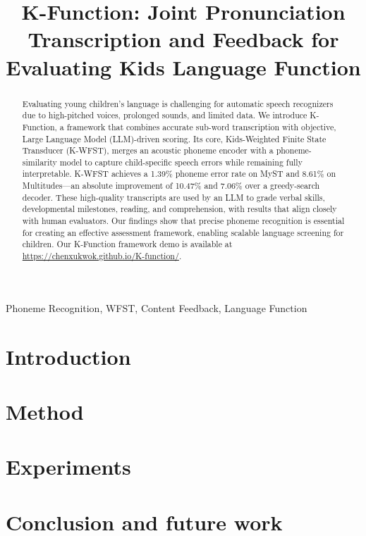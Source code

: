 \documentclass{article}
\title{K-Function: Joint Pronunciation Transcription and Feedback for Evaluating Kids Language Function}
\begin{document}
\ninept
%
\maketitle
%
\begin{abstract}
Evaluating young children's language is challenging for automatic speech recognizers due to high-pitched voices, prolonged sounds, and limited data. We introduce K-Function, a framework that combines accurate sub-word transcription with objective, Large Language Model (LLM)-driven scoring. Its core, Kids-Weighted Finite State Transducer (K-WFST), merges an acoustic phoneme encoder with a phoneme-similarity model to capture child-specific speech errors while remaining fully interpretable. K-WFST achieves a 1.39\% phoneme error rate on MyST and 8.61\% on Multitudes—an absolute improvement of 10.47\% and 7.06\% over a greedy-search decoder. These high-quality transcripts are used by an LLM to grade verbal skills, developmental milestones, reading, and comprehension, with results that align closely with human evaluators. Our findings show that precise phoneme recognition is essential for creating an effective assessment framework, enabling scalable language screening for children. Our K-Function framework demo is available at \url{https://chenxukwok.github.io/K-function/}.
\end{abstract}
%
\begin{keywords}
Phoneme Recognition, WFST, Content Feedback, Language Function
\end{keywords}
%
\section{Introduction}



\section{Method}





\section{Experiments}



\section{Conclusion and future work}














\end{document}
